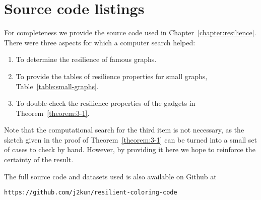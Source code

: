 \chapter{Source code listings}
\label{appendix:resilience}

For completeness we provide the source code used in
Chapter~\ref{chapter:resilience}. There were three aspects for which a computer
search helped:

\begin{enumerate}
   \item To determine the resilience of famous graphs.
   \item To provide the tables of resilience properties for small graphs,
Table~\ref{table:small-graphs}.
   \item To double-check the resilience properties of the gadgets in
Theorem~\ref{theorem:3-1}.
\end{enumerate}

Note that the computational search for the third item is not necessary, as the
sketch given in the proof of Theorem~\ref{theorem:3-1} can be turned into a
small set of cases to check by hand. However, by providing it here we hope to
reinforce the certainty of the result.

The full source code and datasets used is also available on Github at 

\begin{centering}
\texttt{https://github.com/j2kun/resilient-coloring-code}
\end{centering}
